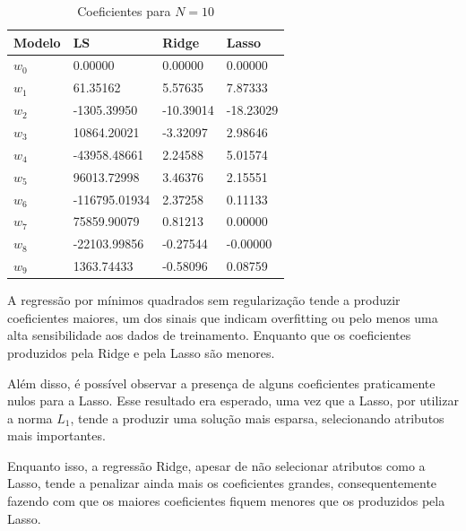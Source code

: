 \begin{table}[H]
    \caption{Coeficientes para $N=10$}
    \centering
    \begin{tabular}{|l|lll|}
        \toprule
        Modelo & LS & Ridge & Lasso \\
        \midrule
        $w_0$ & 0.00000 & 0.00000 & 0.00000 \\
        $w_1$ & 61.35162 & 5.57635 & 7.87333 \\
        $w_2$ & -1305.39950 & -10.39014 & -18.23029 \\
        $w_3$ & 10864.20021 & -3.32097 & 2.98646 \\
        $w_4$ & -43958.48661 & 2.24588 & 5.01574 \\
        $w_5$ & 96013.72998 & 3.46376 & 2.15551 \\
        $w_6$ & -116795.01934 & 2.37258 & 0.11133 \\
        $w_7$ & 75859.90079 & 0.81213 & 0.00000 \\
        $w_8$ & -22103.99856 & -0.27544 & -0.00000 \\
        $w_9$ & 1363.74433 & -0.58096 & 0.08759 \\
        \bottomrule
    \end{tabular}
\end{table}

A regressão por mínimos quadrados sem regularização tende a produzir coeficientes maiores, um dos sinais que indicam overfitting ou pelo menos uma alta sensibilidade aos dados de treinamento. Enquanto que os coeficientes produzidos pela Ridge e pela Lasso são menores.

Além disso, é possível observar a presença de alguns coeficientes praticamente nulos para a Lasso. Esse resultado era esperado, uma vez que a Lasso, por utilizar a norma $L_1$, tende a produzir uma solução mais esparsa, selecionando atributos mais importantes.

Enquanto isso, a regressão Ridge, apesar de não selecionar atributos como a Lasso, tende a penalizar ainda mais os coeficientes grandes, consequentemente fazendo com que os maiores coeficientes fiquem menores que os produzidos pela Lasso.



